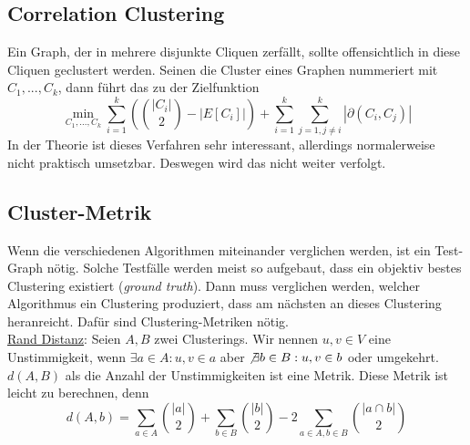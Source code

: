 \documentclass[a4paper, 12pt]{article}
\theoremstyle{plain}
\theoremstyle{definition}
\theoremstyle{lemma}
\theoremstyle{remark}
\theoremstyle{corollary}
\theoremstyle{example}
\begin{document}
	\subsection{Correlation Clustering}
	Ein Graph, der in mehrere disjunkte Cliquen zerfällt, sollte offensichtlich in diese Cliquen geclustert werden. Seinen die Cluster eines Graphen nummeriert mit $C_1,...,C_k$, dann führt das zu der Zielfunktion \[\min_{C_1,...,C_k} \sum_{i=1}^{k} \left(\binom{\left|C_i\right|}{2} - \left|E[C_i]\right|\right) + \sum_{i=1}^k \sum_{j=1, j\neq i}^k \left|\partial(C_i,C_j)\right|\] In der Theorie ist dieses Verfahren sehr interessant, allerdings normalerweise nicht praktisch umsetzbar. Deswegen wird das nicht weiter verfolgt.
	\subsection{Cluster-Metrik}
	Wenn die verschiedenen Algorithmen miteinander verglichen werden, ist ein Test-Graph nötig. Solche Testfälle werden meist so aufgebaut, dass ein objektiv bestes Clustering existiert (\textit{ground truth}). Dann muss verglichen werden, welcher Algorithmus ein Clustering produziert, dass am nächsten an dieses Clustering heranreicht. Dafür sind Clustering-Metriken nötig.\\
	\underline{Rand Distanz}: Seien $A,B$ zwei Clusterings. Wir nennen $u,v \in V$ eine Unstimmigkeit, wenn $\exists a \in A: u,v \in a$ aber $\not\exists b \in B: u,v \in b$ oder umgekehrt. $d(A,B)$ als die Anzahl der Unstimmigkeiten ist eine Metrik. Diese Metrik ist leicht zu berechnen, denn \[d(A,b) = \sum_{a \in A} \binom{\left|a\right|}{2} + \sum_{b \in B} \binom{\left|b\right|}{2} - 2\sum_{a\in A, b \in B} \binom{\left|a\cap b\right|}{2}\]
\end{document}
